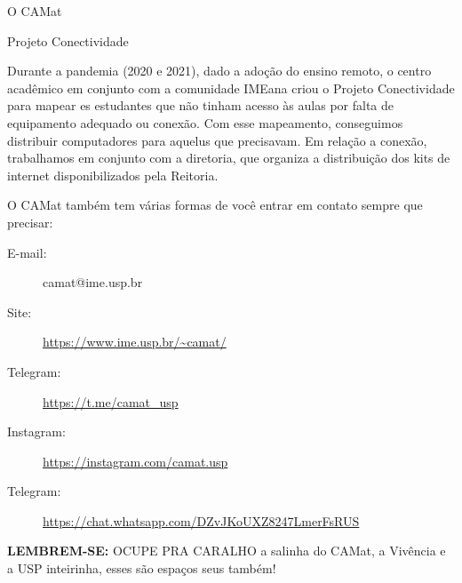 \begin{secao}{O CAMat}
\begin{subsecao}{Projeto Conectividade}

Durante a pandemia (2020 e 2021), dado a adoção do ensino remoto, o centro acadêmico em conjunto 
com a comunidade IMEana criou o Projeto Conectividade para mapear es estudantes que não tinham acesso
às aulas por falta de equipamento adequado ou conexão. Com esse mapeamento, conseguimos distribuir 
computadores para aquelus que precisavam. Em relação a conexão, trabalhamos em conjunto com a diretoria, 
que organiza a distribuição dos kits de internet disponibilizados pela Reitoria.

\end{subsecao}

O CAMat também tem várias formas de você entrar em contato sempre que precisar:

\begin{description}
\item [E-mail:] camat@ime.usp.br
\item [Site:] \url{https://www.ime.usp.br/~camat/}
\item [Telegram:] \url{https://t.me/camat_usp}
\item [Instagram:] \url{https://instagram.com/camat.usp}
\item [Telegram:] \url{https://chat.whatsapp.com/DZvJKoUXZ8247LmerFsRUS}
\end{description}

\textbf{LEMBREM-SE:} OCUPE PRA CARALHO a salinha do CAMat, a Vivência e a USP inteirinha, esses são espaços seus também!


\end{secao}
